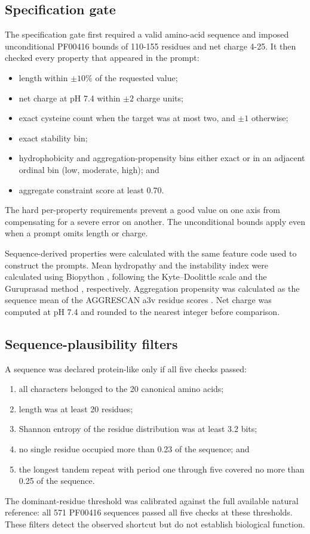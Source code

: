 \documentclass{article}
\begin{document}
\subsection{Specification gate}

The specification gate first required a valid amino-acid sequence and imposed
unconditional PF00416 bounds of 110-155 residues and net charge 4-25. It then
checked every property that appeared in the prompt:
\begin{itemize}
    \item length within $\pm10\%$ of the requested value;
    \item net charge at pH 7.4 within $\pm2$ charge units;
    \item exact cysteine count when the target was at most two, and $\pm1$
    otherwise;
    \item exact stability bin;
    \item hydrophobicity and aggregation-propensity bins either exact or in an
    adjacent ordinal bin (low, moderate, high); and
    \item aggregate constraint score at least 0.70.
\end{itemize}
The hard per-property requirements prevent a good value on one axis from
compensating for a severe error on another. The unconditional bounds apply even
when a prompt omits length or charge.

Sequence-derived properties were calculated with the same feature code used to construct the prompts. Mean hydropathy and the instability index were calculated using Biopython \citep{cock2009biopython}, following the Kyte--Doolittle scale \citep{kyte1982gravy} and the Guruprasad method \citep{guruprasad1990instability}, respectively. Aggregation propensity was calculated as the sequence mean of the AGGRESCAN a3v residue scores \citep{sanchezdegroot2005prediction,conchillosole2007aggrescan}. Net charge was computed at pH 7.4 and rounded to the nearest integer before comparison.

\subsection{Sequence-plausibility filters}

A sequence was declared protein-like only if all five checks passed:
\begin{enumerate}
    \item all characters belonged to the 20 canonical amino acids;
    \item length was at least 20 residues;
    \item Shannon entropy of the residue distribution was at least 3.2 bits;
    \item no single residue occupied more than 0.23 of the sequence; and
    \item the longest tandem repeat with period one through five covered no
    more than 0.25 of the sequence.
\end{enumerate}
The dominant-residue threshold was calibrated against the full available
natural reference: all 571 PF00416 sequences passed all five checks at these
thresholds. These filters detect the observed shortcut but do not establish
biological function.
\end{document}
